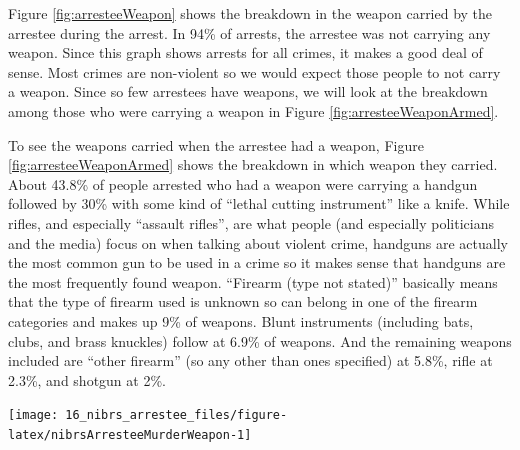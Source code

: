 \documentclass[
]{krantz}
\let\origfigure\figure
\let\endorigfigure\endfigure
\renewenvironment{figure}[1][2] {
    \expandafter\origfigure\expandafter[H]
} {
    \endorigfigure
}
\begin{document}
Figure \ref{fig:arresteeWeapon} shows the breakdown in the
weapon carried by the arrestee during the arrest. In 94\% of
arrests, the arrestee was not carrying any weapon. Since
this graph shows arrests for all crimes, it makes a good
deal of sense. Most crimes are non-violent so we would
expect those people to not carry a weapon. Since so few
arrestees have weapons, we will look at the breakdown among
those who were carrying a weapon in Figure
\ref{fig:arresteeWeaponArmed}.

To see the weapons carried when the arrestee had a weapon,
Figure \ref{fig:arresteeWeaponArmed} shows the breakdown in
which weapon they carried. About 43.8\% of people arrested
who had a weapon were carrying a handgun followed by 30\%
with some kind of ``lethal cutting instrument'' like a
knife. While rifles, and especially ``assault rifles'', are
what people (and especially politicians and the media) focus
on when talking about violent crime, handguns are actually
the most common gun to be used in a crime so it makes sense
that handguns are the most frequently found weapon.
``Firearm (type not stated)'' basically means that the type
of firearm used is unknown so can belong in one of the
firearm categories and makes up 9\% of weapons. Blunt
instruments (including bats, clubs, and brass knuckles)
follow at 6.9\% of weapons. And the remaining weapons
included are ``other firearm'' (so any other than ones
specified) at 5.8\%, rifle at 2.3\%, and shotgun at 2\%.

\begin{figure}

{\centering \texttt{[image: 16\_nibrs\_arrestee\_files/figure-latex/nibrsArresteeMurderWeapon-1]} 

}

\caption{The share of murder and nonnegligent manslaughter arrestees by weapon carried at arrest, 1991-2022.}\label{fig:nibrsArresteeMurderWeapon}
\end{figure}
\end{document}
